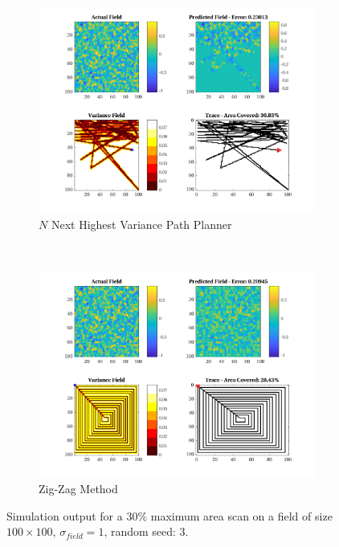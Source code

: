 \begin{figure}[htb!]
\begin{subfigure}[t]{0.5\textwidth}
    \end{subfigure}%
    \\
    \begin{subfigure}[t]{0.5\textwidth}
        \centering
        \includegraphics[width=\linewidth]{figures/hbresults/nnhv_30p_100x100_sf_1_seed_3.png}
        \captionsetup{skip=0.10\baselineskip,size=footnotesize}
        \caption{$N$ Next Highest Variance Path Planner}
    \end{subfigure}%
    ~
    \begin{subfigure}[t]{0.5\textwidth}
        \centering
        \includegraphics[width=\linewidth]{figures/hbresults/zz_30p_100x100_sf_1_seed_3.png}
        \captionsetup{skip=0.10\baselineskip,size=footnotesize}
        \caption{Zig-Zag Method}
    \end{subfigure}%
    \captionsetup{skip=0.20\baselineskip}
    \caption{Simulation output for a $30\%$ maximum area scan on a field of size $100 \times 100$, $\sigma_{field} = 1$, random seed: 3.}
    \label{fig:sim_sigma1_p30_s3}
\end{figure}